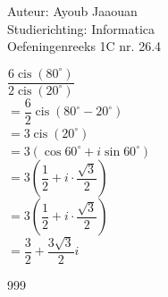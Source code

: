 \documentclass[a4paper]{article}
\begin{document}
  
\noindent \large Auteur: Ayoub Jaaouan          \\
\noindent \large Studierichting: Informatica   \\ 
\noindent \large Oefeningenreeks 1C nr. 26.4   \\

\medskip

\normalsize

$ \dfrac{6\operatorname{cis} (80^\circ)}{2\operatorname{cis} (20^\circ)}  $\\

$ = \dfrac{6}{2}  \operatorname{cis}(80^\circ - 20^\circ) $ \\

$ = 3 \operatorname{cis}(20^\circ)$ \\

$ = 3 \left( \cos 60^\circ + i \sin 60^\circ \right) $ \\

$ = 3 \left( \dfrac{1}{2} + i \cdot \dfrac{\sqrt{3}}{2} \right) $ \\

$ = 3 \left( \dfrac{1}{2} + i \cdot \dfrac{\sqrt{3}}{2} \right) $ \\

$ = \dfrac{3}{2} + \dfrac{3\sqrt{3}}{2}i $ \\






\begin{thebibliography}{999}
\end{thebibliography}
\end{document}
